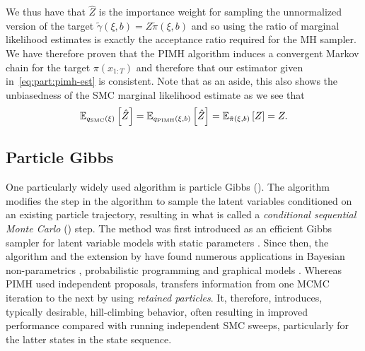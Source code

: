 We thus have that $\hat{Z}$ is the importance weight for sampling the unnormalized
version of the target $\tilde{\gamma}(\xi,b) = Z \tilde{\pi}(\xi,b)$ and so using the
ratio of marginal likelihood estimates is exactly the acceptance ratio required for
the MH sampler.  We
have therefore proven that the PIMH algorithm induces a convergent Markov chain for
the target $\pi(x_{1:T})$ and therefore that our estimator given in~\eqref{eq:part:pimh-est} is
consistent.
Note that as an aside, this also shows the unbiasedness of the SMC marginal likelihood estimate
as we see that
\begin{align}
\mathbb{E}_{q_{\text{SMC}}(\mathbf{\xi})} \left[\hat{Z}\right] = \mathbb{E}_{q_{\text{PIMH}}(\mathbf{\xi},b)} 
\left[\hat{Z}\right]=\mathbb{E}_{\tilde{\pi}(\xi,b)} \left[Z\right]=Z.
\end{align}

\subsection{Particle Gibbs}
\label{sec:part:pmcmc:pgibbs}

One particularly widely used \pmcmc algorithm is particle Gibbs (\pg). The \pg algorithm modifies the 
\smc step in the \pmcmc algorithm to sample the latent variables conditioned on an existing particle
 trajectory, resulting in what is called a \emph{conditional sequential Monte Carlo} (\csmc) step. The \pg method
  was first introduced as an efficient Gibbs sampler for latent variable models with static parameters 
  \citep{andrieu2010particle}. Since then, the \pg algorithm and the extension by \citet{lindstenJS2014} have 
  found numerous applications in \eg Bayesian non-parametrics \citep{ValeraFSPC2015,tripuraneni2015}, 
  probabilistic programming \citep{wood2014new,vandemeent_aistats_2015} and graphical models 
  \citep{everitt2012,naessethLS2014,naessethLS2015nested}.  Whereas PIMH used independent proposals, 
  \pg transfers information from one MCMC iteration to the next by using \emph{retained particles}.  It, therefore,
  introduces, typically desirable, hill-climbing behavior, often resulting in improved performance
  compared with running independent SMC sweeps, particularly for the latter states in the state sequence.

